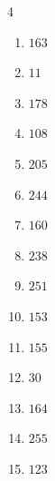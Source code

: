 \begin{multicols}{4}
\begin{enumerate}

  \item $163$


  \item $11$


  \item $178$


  \item $108$


  \item $205$


  \item $244$


  \item $160$


  \item $238$


  \item $251$


  \item $153$


  \item $155$


  \item $30$


  \item $164$


  \item $255$


\columnbreak %

  \item $123$



\end{enumerate}
\end{multicols}

